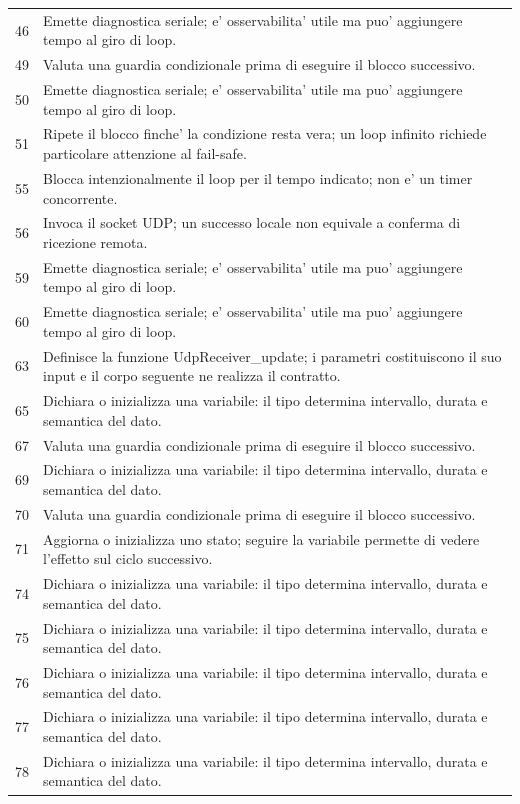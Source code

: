 \documentclass[11pt,a4paper]{article}
\begin{document}
\begin{longtable}{p{}p{}}
46 & Emette diagnostica seriale; e' osservabilita' utile ma puo' aggiungere tempo al giro di loop. \\
49 & Valuta una guardia condizionale prima di eseguire il blocco successivo. \\
50 & Emette diagnostica seriale; e' osservabilita' utile ma puo' aggiungere tempo al giro di loop. \\
51 & Ripete il blocco finche' la condizione resta vera; un loop infinito richiede particolare attenzione al fail-safe. \\
55 & Blocca intenzionalmente il loop per il tempo indicato; non e' un timer concorrente. \\
56 & Invoca il socket UDP; un successo locale non equivale a conferma di ricezione remota. \\
59 & Emette diagnostica seriale; e' osservabilita' utile ma puo' aggiungere tempo al giro di loop. \\
60 & Emette diagnostica seriale; e' osservabilita' utile ma puo' aggiungere tempo al giro di loop. \\
63 & Definisce la funzione UdpReceiver\_\allowbreak{}update; i parametri costituiscono il suo input e il corpo seguente ne realizza il contratto. \\
65 & Dichiara o inizializza una variabile: il tipo determina intervallo, durata e semantica del dato. \\
67 & Valuta una guardia condizionale prima di eseguire il blocco successivo. \\
69 & Dichiara o inizializza una variabile: il tipo determina intervallo, durata e semantica del dato. \\
70 & Valuta una guardia condizionale prima di eseguire il blocco successivo. \\
71 & Aggiorna o inizializza uno stato; seguire la variabile permette di vedere l'effetto sul ciclo successivo. \\
74 & Dichiara o inizializza una variabile: il tipo determina intervallo, durata e semantica del dato. \\
75 & Dichiara o inizializza una variabile: il tipo determina intervallo, durata e semantica del dato. \\
76 & Dichiara o inizializza una variabile: il tipo determina intervallo, durata e semantica del dato. \\
77 & Dichiara o inizializza una variabile: il tipo determina intervallo, durata e semantica del dato. \\
78 & Dichiara o inizializza una variabile: il tipo determina intervallo, durata e semantica del dato. \\

\end{longtable}
\end{document}
